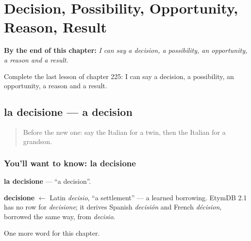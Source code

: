 
\chapter{Decision, Possibility, Opportunity, Reason, Result}
\label{ch:it-decision-possibility-opportunity-reason-result}

\begin{chapteropening}
\textbf{By the end of this chapter:} \emph{I can say a decision, a possibility, an opportunity, a reason and a result.}

Complete the last lesson of chapter 225: I can say a decision, a possibility, an opportunity, a reason and a result.
\end{chapteropening}

\section[la decisione]{la decisione — a decision}

\label{lesson:IT-C225-decisione}



\begin{quote}
Before the new one: say the Italian for a twin, then the Italian for a grandson.
\end{quote}

\subsection*{You'll want to know: la decisione}
\textbf{la decisione} — \textquotedblleft{}a decision\textquotedblright{}.

\begin{cousinweb}
\textbf{decisione} $\leftarrow$ Latin \emph{decisio}, \textquotedblleft{}a settlement\textquotedblright{} — a learned borrowing. EtymDB 2.1 has no row for \emph{decisione}; it derives Spanish \emph{decisión} and French \emph{décision}, borrowed the same way, from \emph{decisio}.
\end{cousinweb}

\begin{grammarlens}[title={What you've built}]
One more word for this chapter.
\end{grammarlens}

